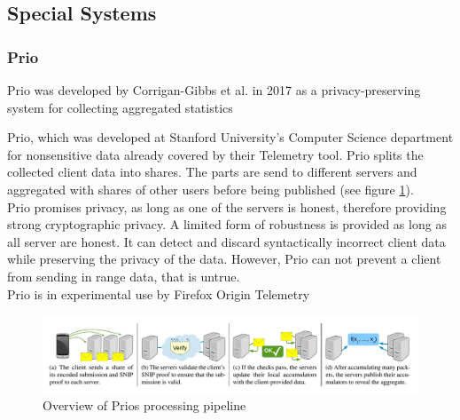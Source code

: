 %
%
\subsection{Special Systems}
\label{subsec:related:special}
%
\subsubsection{Prio}
    Prio was developed by Corrigan-Gibbs et al.\cite{corrigan-gibbs_prio_2017} in 2017 as a privacy-preserving
    system for collecting aggregated statistics
    
    Prio\cite{corrigan-gibbs_prio_2017}, which was developed at Stanford University's Computer Science department for nonsensitive data already covered by their Telemetry tool. 
    Prio splits the collected client data into shares. 
    The parts are send to different servers and aggregated with shares of other users before being published (see figure \ref{fig:prio_overview})\cite{corrigan-gibbs_prio_2017}.\\
    Prio promises privacy, as long as one of the servers is honest, therefore providing strong cryptographic privacy. A limited form of robustness is provided as long as all server are honest. It can detect and discard syntactically incorrect client data while preserving the privacy of the data. However, Prio can not prevent a client from sending in range data, that is untrue\cite{corrigan-gibbs_prio_2017}.\\
    Prio is in experimental use by Firefox Origin Telemetry\\
    
    \begin{figure}
        \centering
        \includegraphics[width=\textwidth]{latex/figures/prio_overview.jpg}
        \caption{Overview of Prios processing pipeline\cite{corrigan-gibbs_prio_2017}}
        \label{fig:prio_overview}
    \end{figure}

